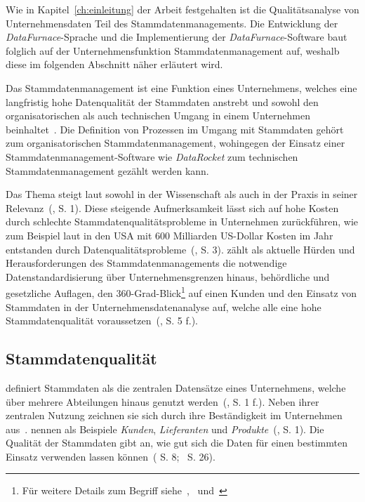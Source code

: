 \documentclass[
  language=german, %
  type=bachelor,%
  ngerman
]{isthesis}
\begin{document}
\begin{content}
  Wie in Kapitel~\ref{ch:einleitung} der Arbeit festgehalten ist die
  Qualitätsanalyse von Unternehmensdaten Teil des Stammdatenmanagements. Die
  Entwicklung der \textit{DataFurnace}-Sprache und die Implementierung der
  \textit{DataFurnace}-Software baut folglich auf der Unternehmensfunktion
  Stammdatenmanagement auf, weshalb diese im folgenden Abschnitt näher
  erläutert wird.

	Das Stammdatenmanagement ist eine Funktion eines Unternehmens, welches eine
	langfristig hohe Datenqualität der Stammdaten anstrebt und sowohl den
	organisatorischen als auch technischen Umgang in einem Unternehmen
	beinhaltet~\cite[][S.  2]{legner2007stammdaten}.  Die Definition von
	Prozessen im Umgang mit Stammdaten gehört \zB{} zum organisatorischen
	Stammdatenmanagement, wohingegen der Einsatz einer Stammdatenmanagement-Software
	wie \textit{DataRocket} zum technischen Stammdatenmanagement gezählt werden
	kann.  

	Das Thema steigt laut \textsc{\citeauthor{otto2012design}} sowohl in der
	Wissenschaft als auch in der Praxis in seiner
	Relevanz~(\citeyear{otto2012design}, S. 1). Diese steigende Aufmerksamkeit
	lässt sich auf hohe Kosten durch schlechte Stammdatenqualitätsprobleme in
	Unternehmen zurückführen, wie zum Beispiel laut
	\textsc{\citeauthor{eckerson2002data}} in den USA mit 600 Milliarden
	US-Dollar Kosten im Jahr entstanden durch
	Datenqualitätsprobleme~(\citeyear{eckerson2002data}, S. 3).
	\textsc{\citeauthor{otto2011stammdatenmanagement}} zählt als aktuelle Hürden
	und Herausforderungen des Stammdatenmanagements die notwendige
	Datenstandardisierung über Unternehmensgrenzen hinaus, behördliche und
	gesetzliche Auflagen, den 360-Grad-Blick\footnote{Für weitere Details zum
	Begriff siehe~\cite{kotorov2003customer},~\cite{otto2016datenqualitat}
	und~\cite{otto2016master}} auf einen Kunden und den Einsatz von Stammdaten in
	der Unternehmensdatenanalyse auf, welche alle eine hohe Stammdatenqualität
	voraussetzen~(\citeyear{otto2011stammdatenmanagement}, S. 5 f.).
	

	\subsection{Stammdatenqualität}\label{subsec:stammdatenqualität}
	
	\textsc{\citeauthor{otto2012design}} definiert Stammdaten als die zentralen
	Datensätze eines Unternehmens, welche über mehrere Abteilungen hinaus genutzt
	werden~(\citeyear{otto2012design}, S.  1 f.).  Neben ihrer zentralen Nutzung
	zeichnen sie sich durch ihre Beständigkeit im Unternehmen aus~\cite[][S.
	1]{knolmayer2006quality}.  \textsc{\citeauthor{knolmayer2006quality}} nennen
	als Beispiele \textit{Kunden}, \textit{Lieferanten} und
	\textit{Produkte}~(\citeyear{knolmayer2006quality}, S. 1). Die Qualität der
	Stammdaten gibt an, wie gut sich die Daten für einen bestimmten Einsatz
	verwenden lassen können~(\citeauthor{otto2011stammdatenmanagement}
	\citeyear{otto2011stammdatenmanagement} S.
	8;~\citeauthor{hinrichs2002datenqualitatsmanagement}
	\citeyear{hinrichs2002datenqualitatsmanagement} S. 26).


\end{content}
\end{document}
